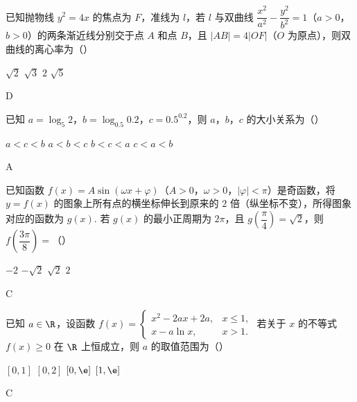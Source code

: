 \begin{problem}
已知抛物线 \( y^2=4x \) 的焦点为 \(F\)，准线为 \( l \)，若 \( l \) 与双曲线 \( \dfrac{x^2}{a^2}-\dfrac{y^2}{b^2}=1 \)（\(a>0\)，\(b>0\)）的两条渐近线分别交于点 \(A\) 和点 \(B\)，且 \( |AB|=4|OF| \)（\(O\) 为原点），则双曲线的离心率为（\quad）

\choices
    {\(\sqrt2\)}
    {\(\sqrt3\)}
    {\(2\)}
    {\(\sqrt5\)}
\begin{answer}
D
\end{answer}
\end{problem}



\begin{problem}
已知 \( a=\log_5 2 \)，\( b=\log_{0.5}0.2 \)，\( c=0.5^{0.2} \)，则 \(a\)，\(b\)，\(c\) 的大小关系为（\quad）

\choices
    {\(a<c<b\)}
    {\(a<b<c\)}
    {\(b<c<a\)}
    {\(c<a<b\)}
\begin{answer}
A
\end{answer}
\end{problem}



\begin{problem}
已知函数 \( f(x)=A\sin(\omega x+\varphi) \)（\(A>0\)，\(\omega>0\)，\(|\varphi|<\pi\)）是奇函数，将 \( y=f(x) \) 的图象上所有点的横坐标伸长到原来的 \( 2 \) 倍（纵坐标不变），所得图象对应的函数为 \( g(x) \). 若 \( g(x) \) 的最小正周期为 \( 2\pi \)，且 \( g\!\left( \dfrac{\pi}{4} \right)=\sqrt2 \)，则 \( f\!\left( \dfrac{3\pi}{8} \right)= \)（\quad）

\choices
    {\(-2\)}
    {\(-\sqrt2\)}
    {\(\sqrt2\)}
    {\(2\)}
\begin{answer}
C
\end{answer}
\end{problem}



\begin{problem}
已知 \( a\in \R \)，设函数 \( f(x)=\begin{cases}
x^2-2ax+2a, & x\le 1,\\
x-a\ln x, & x>1.
\end{cases} \)
若关于 \( x \) 的不等式 \( f(x)\ge 0 \) 在 \( \R \) 上恒成立，则 \( a \) 的取值范围为（\quad）

\choices
    {\([0,1]\)}
    {\([0,2]\)}
    {\([0,\e]\)}
    {\([1,\e]\)}
\begin{answer}
C
\end{answer}
\end{problem}


